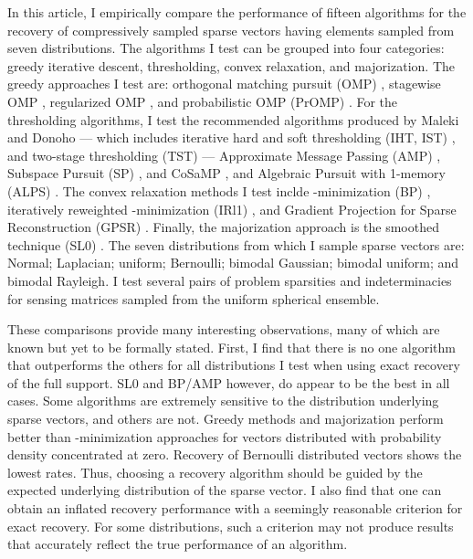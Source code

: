 \documentclass[11pt,draftcls,onecolumn]{IEEEtran}
\begin{document}
In this article, I empirically compare the performance
of fifteen algorithms for the recovery of 
compressively sampled sparse vectors 
having elements sampled from seven distributions. 
The algorithms I test can be grouped into four categories: 
greedy iterative descent, thresholding, convex relaxation, and majorization.
The greedy approaches I test are:
orthogonal matching pursuit (OMP) \cite{Pati1993, Tropp2004},
stagewise OMP \cite{Donoho2006},
regularized OMP \cite{Needell2010}, 
and probabilistic OMP (PrOMP) \cite{Divekar2010}.
For the thresholding algorithms,
I test the recommended algorithms produced by Maleki and Donoho \cite{Maleki2010}
--- which includes iterative hard and soft thresholding (IHT, IST) \cite{Blumensath2009}, 
and two-stage thresholding (TST) ---
Approximate Message Passing (AMP) \cite{Donoho2009},
Subspace Pursuit (SP) \cite{Dai2009},
and CoSaMP \cite{Needell2009},
and Algebraic Pursuit with 1-memory (ALPS) \cite{Cevher2011}.
The convex relaxation methods I test inclde
-minimization (BP) \cite{Chen1998},
iteratively reweighted -minimization (IRl1) \cite{Candes2008b},
and Gradient Projection for Sparse Reconstruction (GPSR) \cite{Figueiredo2007}.
Finally, the majorization approach is the smoothed  technique (SL0) \cite{Mohimani2009}.
The seven distributions from which I sample sparse vectors are:
Normal; Laplacian; uniform;
Bernoulli; bimodal Gaussian; bimodal uniform; and bimodal Rayleigh.
I test several pairs of problem sparsities and indeterminacies
for sensing matrices sampled from the uniform spherical ensemble.

These comparisons provide many interesting observations,
many of which are known but yet to be formally stated.
First, I find that there is no one algorithm that
outperforms the others for all distributions I test
when using exact recovery of the full support.
SL0 and BP/AMP however, do appear to be the best in all cases.
Some algorithms are extremely sensitive to the distribution
underlying sparse vectors, and others are not.
Greedy methods and majorization perform better than
-minimization approaches
for vectors distributed with probability density concentrated at zero.
Recovery of Bernoulli distributed vectors shows the lowest rates.
Thus, choosing a recovery algorithm should be
guided by the expected underlying distribution of the sparse vector.
I also find that one can obtain an inflated recovery performance 
with a seemingly reasonable criterion for exact recovery.
For some distributions, such a criterion may not produce results
that accurately reflect the true performance of an algorithm.
\end{document}

